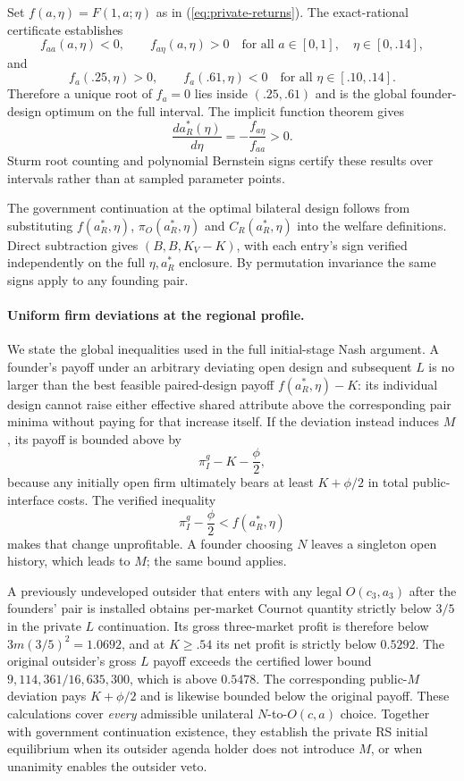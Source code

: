 Set \(f(a,\eta)=F(1,a;\eta)\) as in (\ref{eq:private-returns}). The exact-rational certificate establishes
\[
 f_{aa}(a,\eta)<0,\qquad f_{a\eta}(a,\eta)>0
 \quad \text{for all }a\in[0,1],\quad\eta\in[0,.14],
\]
and
\[
 f_a(.25,\eta)>0,\qquad
 f_a(.61,\eta)<0
 \quad\text{for all }\eta\in[.10,.14].
\]
Therefore a unique root of \(f_a=0\) lies inside \((.25,.61)\) and is the global founder-design optimum on the full interval. The implicit function theorem gives
\[
 \frac{da_R^*(\eta)}{d\eta}
 =-\frac{f_{a\eta}}{f_{aa}}>0.
\]
Sturm root counting and polynomial Bernstein signs certify these results over intervals rather than at sampled parameter points.

The government continuation at the optimal bilateral design follows from substituting \(f(a_R^*,\eta)\), \(\pi_O(a_R^*,\eta)\) and \(C_R(a_R^*,\eta)\) into the welfare definitions. Direct subtraction gives \((B,B,K_V-K)\), with each entry's sign verified independently on the full \(\eta,a_R^*\) enclosure. By permutation invariance the same signs apply to any founding pair.

\paragraph{Uniform firm deviations at the regional profile.}
We state the global inequalities used in the full initial-stage Nash argument. A founder's payoff under an arbitrary deviating open design and subsequent \(L\) is no larger than the best feasible paired-design payoff \(f(a_R^*,\eta)-K\): its individual design cannot raise either effective shared attribute above the corresponding pair minima without paying for that increase itself. If the deviation instead induces \(M\), its payoff is bounded above by
\[
 \pi_I^g-K-\frac{\phi}{2},
\]
because any initially open firm ultimately bears at least \(K+\phi/2\) in total public-interface costs. The verified inequality
\[
 \pi_I^g-\frac{\phi}{2}<f(a_R^*,\eta)
\]
makes that change unprofitable. A founder choosing \(N\) leaves a singleton open history, which leads to \(M\); the same bound applies.

A previously undeveloped outsider that enters with any legal \(O(c_3,a_3)\) after the founders' pair is installed obtains per-market Cournot quantity strictly below \(3/5\) in the private \(L\) continuation. Its gross three-market profit is therefore below \(3m(3/5)^2=1.0692\), and at \(K\ge.54\) its net profit is strictly below \(0.5292\). The original outsider's gross \(L\) payoff exceeds the certified lower bound \(9{,}114{,}361/16{,}635{,}300\), which is above \(0.5478\). The corresponding public-\(M\) deviation pays \(K+\phi/2\) and is likewise bounded below the original payoff. These calculations cover \emph{every} admissible unilateral \(N\)-to-\(O(c,a)\) choice. Together with government continuation existence, they establish the private RS initial equilibrium when its outsider agenda holder does not introduce \(M\), or when unanimity enables the outsider veto.

